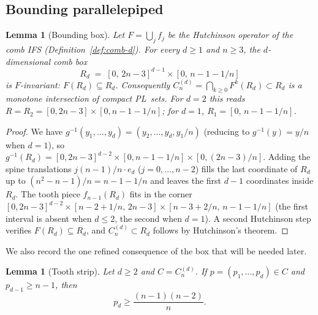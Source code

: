 \documentclass{amsart}
\newtheorem{lemma}[theorem]{Lemma}
\theoremstyle{definition}
\theoremstyle{remark}
\begin{document}

\subsection{Bounding parallelepiped}
\label{ssec:bbox}

\begin{lemma}[Bounding box]\label{lem:bound}
Let $F = \bigcup_j f_j$ be the Hutchinson operator of the comb IFS
(Definition~\ref{def:comb-d}).  For every $d \ge 1$ and $n \ge 3$,
the \emph{$d$-dimensional comb box}
\begin{equation}\label{eq:bound-R}
  R_d \;=\; [0,\, 2n{-}3]^{d-1} \times [0,\, n{-}1{-}1/n]
\end{equation}
is $F$-invariant: $F(R_d) \subseteq R_d$.  Consequently
$C_n^{(d)} = \bigcap_{k\ge 0} F^k(R_d) \subset R_d$ is a monotone
intersection of compact PL~sets.
For $d = 2$ this reads $R = R_2 = [0,2n{-}3] \times [0,n{-}1{-}1/n]$;
for $d = 1$, $R_1 = [0,\,n{-}1{-}1/n]$.
\end{lemma}

\begin{proof}
We have $g^{-1}(y_1, \ldots, y_d) = (y_2, \ldots, y_d, y_1/n)$
(reducing to $g^{-1}(y) = y/n$ when $d = 1$),
so $g^{-1}(R_d) = [0,2n{-}3]^{d-2} \times [0, n{-}1{-}1/n]
\times [0, (2n{-}3)/n]$.
Adding the spine translations $j(n{-}1)/n\cdot e_d$ ($j = 0, \ldots, n{-}2$)
fills the last coordinate of $R_d$ up to
$(n^2{-}n{-}1)/n = n{-}1{-}1/n$ and leaves the first $d{-}1$ coordinates
inside $R_d$.
The tooth piece $f_{n-1}(R_d)$ fits in the corner
$[0, 2n{-}3]^{d-2} \times [n{-}2{+}1/n,\, 2n{-}3]
\times [n{-}3{+}2/n,\, n{-}1{-}1/n]$
(the first interval is absent when $d \le 2$, the second when $d = 1$).
A second Hutchinson step verifies $F(R_d) \subseteq R_d$, and
$C_n^{(d)} \subset R_d$ follows by Hutchinson's theorem.
\end{proof}

We also record the one refined consequence of the box that will be
needed later.

\begin{lemma}[Tooth strip]\label{lem:tooth-strip}
Let $d \ge 2$ and $C = C_n^{(d)}$.  If
$p=(p_1,\ldots,p_d) \in C$ and $p_{d-1} \ge n{-}1$,
then
\[
  p_d \ge \frac{(n{-}1)(n{-}2)}{n}.
\]
\end{lemma}
\end{document}
